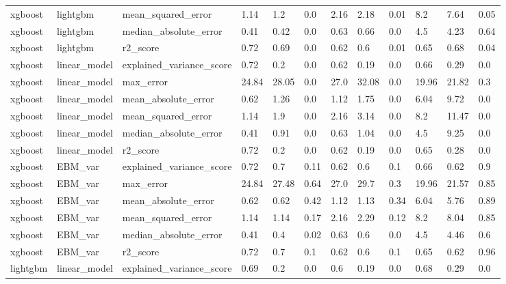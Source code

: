 \begin{table}[h!]
{\begin{tabular}{llllllllllll}
xgboost       & lightgbm       & mean\_squared\_error       & 1.14  & 1.2   & 0.0  & 2.16  & 2.18  & 0.01 & 8.2   & 7.64  & 0.05 \\
xgboost       & lightgbm       & median\_absolute\_error    & 0.41  & 0.42  & 0.0  & 0.63  & 0.66  & 0.0  & 4.5   & 4.23  & 0.64 \\
xgboost       & lightgbm       & r2\_score                  & 0.72  & 0.69  & 0.0  & 0.62  & 0.6   & 0.01 & 0.65  & 0.68  & 0.04 \\
xgboost       & linear\_model  & explained\_variance\_score & 0.72  & 0.2   & 0.0  & 0.62  & 0.19  & 0.0  & 0.66  & 0.29  & 0.0  \\
xgboost       & linear\_model  & max\_error                 & 24.84 & 28.05 & 0.0  & 27.0  & 32.08 & 0.0  & 19.96 & 21.82 & 0.3  \\
xgboost       & linear\_model  & mean\_absolute\_error      & 0.62  & 1.26  & 0.0  & 1.12  & 1.75  & 0.0  & 6.04  & 9.72  & 0.0  \\
xgboost       & linear\_model  & mean\_squared\_error       & 1.14  & 1.9   & 0.0  & 2.16  & 3.14  & 0.0  & 8.2   & 11.47 & 0.0  \\
xgboost       & linear\_model  & median\_absolute\_error    & 0.41  & 0.91  & 0.0  & 0.63  & 1.04  & 0.0  & 4.5   & 9.25  & 0.0  \\
xgboost       & linear\_model  & r2\_score                  & 0.72  & 0.2   & 0.0  & 0.62  & 0.19  & 0.0  & 0.65  & 0.28  & 0.0  \\
xgboost       & EBM\_var & explained\_variance\_score & 0.72  & 0.7   & 0.11 & 0.62  & 0.6   & 0.1  & 0.66  & 0.62  & 0.9  \\
xgboost       & EBM\_var & max\_error                 & 24.84 & 27.48 & 0.64 & 27.0  & 29.7  & 0.3  & 19.96 & 21.57 & 0.85 \\
xgboost       & EBM\_var & mean\_absolute\_error      & 0.62  & 0.62  & 0.42 & 1.12  & 1.13  & 0.34 & 6.04  & 5.76  & 0.89 \\
xgboost       & EBM\_var & mean\_squared\_error       & 1.14  & 1.14  & 0.17 & 2.16  & 2.29  & 0.12 & 8.2   & 8.04  & 0.85 \\
xgboost       & EBM\_var & median\_absolute\_error    & 0.41  & 0.4   & 0.02 & 0.63  & 0.6   & 0.0  & 4.5   & 4.46  & 0.6  \\
xgboost       & EBM\_var & r2\_score                  & 0.72  & 0.7   & 0.1  & 0.62  & 0.6   & 0.1  & 0.65  & 0.62  & 0.96 \\
lightgbm      & linear\_model  & explained\_variance\_score & 0.69  & 0.2   & 0.0  & 0.6   & 0.19  & 0.0  & 0.68  & 0.29  & 0.0  \\

\end{tabular}}
\end{table}
